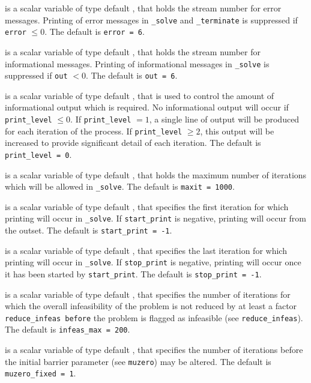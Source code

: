 \begin{description}

 is a scalar variable of type default \integer, that holds the
stream number for error messages. Printing of error messages in
{\tt \packagename\_solve} and {\tt \packagename\_terminate} is suppressed if
{\tt error} $\leq 0$.
The default is {\tt error = 6}.

 is a scalar variable of type default \integer, that holds the
stream number for informational messages. Printing of informational messages in
{\tt \packagename\_solve} is suppressed if {\tt out} $< 0$.
The default is {\tt out = 6}.

 is a scalar variable of type default \integer, that is used
to control the amount of informational output which is required. No
informational output will occur if {\tt print\_level} $\leq 0$. If
{\tt print\_level} $= 1$, a single line of output will be produced for each
iteration of the process. If {\tt print\_level} $\geq 2$, this output will be
increased to provide significant detail of each iteration.
The default is {\tt print\_level = 0}.

 is a scalar variable of type default \integer, that holds the
maximum number of iterations which will be allowed in {\tt \packagename\_solve}.
The default is {\tt maxit = 1000}.

 is a scalar variable of type default \integer, that specifies
the first iteration for which printing will occur in {\tt \packagename\_solve}.
If {\tt start\_print} is negative, printing will occur from the outset.
The default is {\tt start\_print = -1}.

 is a scalar variable of type default \integer, that specifies
the last iteration for which printing will occur in  {\tt \packagename\_solve}.
If {\tt stop\_print} is negative, printing will occur once it has been
started by {\tt start\_print}.
The default is {\tt stop\_print = -1}.

 is a scalar variable of type default \integer, that specifies
the number of iterations for which the overall infeasibility
of the problem is not reduced by at least a factor {\tt reduce\_infeas
before} the problem is flagged as infeasible (see {\tt reduce\_infeas}).
The default is {\tt infeas\_max = 200}.

 is a scalar variable of type default \integer,
that specifies
the number of iterations before the initial barrier parameter
(see {\tt muzero}) may be altered.
The default is {\tt muzero\_fixed = 1}.


\end{description}
